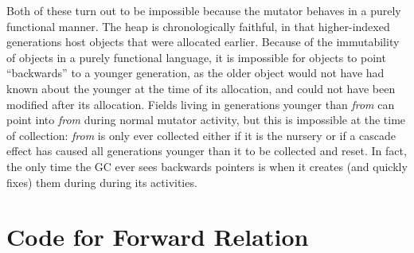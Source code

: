Both of these turn out to be impossible because the 
mutator behaves in a purely functional manner.
The heap is chronologically
faithful, in that higher-indexed generations host
objects that were allocated earlier. Because
of the immutability of objects in a purely functional language, 
it is impossible for objects to point ``backwards'' to 
a younger generation, as the older object would not have
had known about the younger at the time of its allocation, and could not 
have been modified after its allocation. Fields living in generations 
younger than \emph{from} can point into \emph{from} during 
normal mutator activity, but this is
impossible at the time of collection: 
\emph{from} is only ever collected either if it is
the nursery or if a cascade effect has caused all generations younger
than it to be collected and reset. 
In fact, the only time the GC ever sees backwards pointers
is when it creates (and quickly fixes) them during during its 
activities.

\section{Code for Forward Relation}
\label{apx:forwardrelation}


% 
